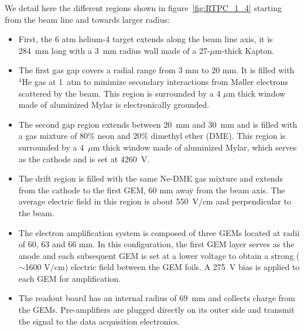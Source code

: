 \documentclass[twocolumn,showpacs,superscriptaddress,groupedaddress]{revtex4}
\begin{document}
We detail here the different regions shown in figure~\ref{fig:RTPC_1_4} starting 
from the beam line and towards larger radius:\\
\begin{itemize}
   \item First, the 6 atm helium-4 target extends along the beam line axis, it 
      is 284~mm long with a 3~mm radius wall made of a 27-$\mu$m-thick Kapton.
   \item The first gas gap covers a radial range from 3 mm to 20 mm. It is 
      filled with $^{4}$He gas at 1~atm to minimize secondary interactions from
      M\o ller electrons scattered by the beam. This 
      region is surrounded by a 4 $\mu$m thick window made of aluminized Mylar 
      is electronically grounded.
   \item The second gap region extends between 20~mm and 30~mm and is filled with a 
      gas mixture of 80$\%$ neon and 20$\%$ dimethyl ether (DME). This region 
      is surrounded by a 4~$\mu$m thick window made of aluminized Mylar, which 
      serves as the cathode and is set at 4260~V.
   \item The drift region is filled with the same Ne-DME gas mixture and extends 
      from the cathode to the first GEM, 60 mm away 
      from the beam axis. The average electric field in this region is about 550~V/cm 
      and perpendicular to the beam.
   \item The electron amplification system is composed of three GEMs located at 
      radii of 60, 63 and 66 mm. In this configuration, the first GEM layer 
      serves as the anode and each subsequent GEM is set at a lower voltage to
      obtain a strong ($\sim$1600 V/cm) electric field between the GEM foils. A 
      275~V bias is applied to each GEM for amplification.
   \item The readout board has an internal radius of 69~mm and collects charge
     from the GEMs. Pre-amplifiers are plugged directly on its outer side and
     transmit the signal to the data acquisition electronics.
\end{itemize}
\end{document}
